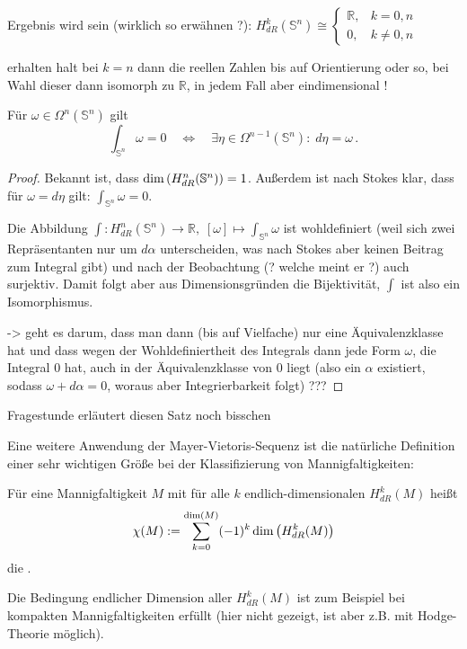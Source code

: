 \documentclass[../H_Analysis_main.tex]{subfiles}
\begin{document}
\begin{bsp}
Ergebnis wird sein (wirklich so erwähnen ?): $H_{dR}^k(\mathbb{S}^n) \cong \begin{cases} \mathbb{R}, & k = 0, n \\ 0, & k \neq 0, n\end{cases}$

erhalten halt bei $k = n$ dann die reellen Zahlen bis auf Orientierung oder so, bei Wahl dieser dann isomorph zu $\mathbb{R}$, in jedem Fall aber eindimensional !

\begin{cor}\label{cor:intverschwstamm}
Für $\omega \in \Omega^n(\mathbb{S}^n)$ gilt
\begin{equation}
\int_{\mathbb{S}^n} \omega = 0 \quad \Leftrightarrow \quad \exists \eta \in \Omega^{n - 1}(\mathbb{S}^n): \; d\eta = \omega \, .
\end{equation}
\end{cor}
\begin{proof}
Bekannt ist, dass $\dim\qty(H_{dR}^n(\mathbb{S}^n)) = 1$. Außerdem ist nach Stokes klar, dass für $\omega = d\eta$ gilt: $\int_{\mathbb{S}^n} \omega = 0$.

Die Abbildung $\int: H_{dR}^n(\mathbb{S}^n) \rightarrow \mathbb{R}, \; [\omega] \mapsto \int_{\mathbb{S}^n} \omega$ ist wohldefiniert (weil sich zwei Repräsentanten nur um $d\alpha$ unterscheiden, was nach Stokes aber keinen Beitrag zum Integral gibt) und nach der Beobachtung (? welche meint er ?) auch surjektiv. Damit folgt aber aus Dimensionsgründen die Bijektivität, $\int$ ist also ein Isomorphismus.

-> geht es darum, dass man dann (bis auf Vielfache) nur eine Äquivalenzklasse hat und dass wegen der Wohldefiniertheit des Integrals dann jede Form $\omega$, die Integral 0 hat, auch in der Äquivalenzklasse von 0 liegt (also ein $\alpha$ existiert, sodass $\omega + d\alpha = 0$, woraus aber Integrierbarkeit folgt) ???
\end{proof}

Fragestunde erläutert diesen Satz noch bisschen
\end{bsp}



Eine weitere Anwendung der Mayer-Vietoris-Sequenz ist die natürliche Definition einer sehr wichtigen Größe bei der Klassifizierung von Mannigfaltigkeiten:
\begin{defi}
Für eine Mannigfaltigkeit $M$ mit für alle $k$ endlich-dimensionalen $H_{dR}^k(M)$ heißt
\begin{equation}
\chi(M) := \sum_{k = 0}^{\dim(M)} (-1)^k \dim\qty(H_{dR}^k(M))
\end{equation}
die .
\end{defi}
Die Bedingung endlicher Dimension aller $H_{dR}^k(M)$ ist zum Beispiel bei kompakten Mannigfaltigkeiten erfüllt (hier nicht gezeigt, ist aber z.B. mit Hodge-Theorie möglich).
\end{document}
